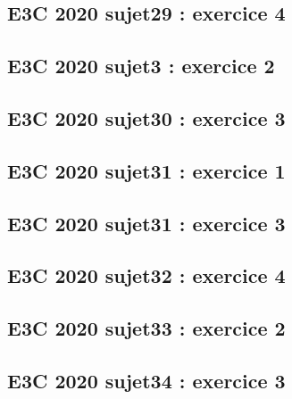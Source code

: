 \documentclass[lang=fr,edition=teacher,layout=sheet]{mxbook}
\begin{document}
\par\bigskip
{}\subsection*{E3C 2020 sujet29 : exercice 4}
\begingroup\endgroup
\par\bigskip
{}\subsection*{E3C 2020 sujet3 : exercice 2}
\begingroup\endgroup
\par\bigskip
{}\subsection*{E3C 2020 sujet30 : exercice 3}
\begingroup\endgroup
\par\bigskip
{}\subsection*{E3C 2020 sujet31 : exercice 1}
\begingroup\endgroup
\par\bigskip
{}\subsection*{E3C 2020 sujet31 : exercice 3}
\begingroup\endgroup
\par\bigskip
{}\subsection*{E3C 2020 sujet32 : exercice 4}
\begingroup\endgroup
\par\bigskip
{}\subsection*{E3C 2020 sujet33 : exercice 2}
\begingroup\endgroup
\par\bigskip
{}\subsection*{E3C 2020 sujet34 : exercice 3}
\end{document}
